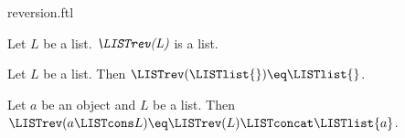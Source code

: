 \documentclass{naproche-library}
\begin{document}
\begin{smodule}[title=Reversion]{reversion.ftl}

\begin{signature}[forthel,id=RevSig]
  Let $L$ be a list.
  $\emph{\LISTrev(L)}$ is a list.
\end{signature}

\begin{axiom}[forthel,id=RevOfNilAx]
  Let $L$ be a list.
  Then $\LISTrev(\LISTlist{}) \eq \LISTlist{}$.
\end{axiom}

\begin{axiom}[forthel,id=RevOfConsAx]
  Let $a$ be an object and $L$ be a list.
  Then $\LISTrev(a \LISTcons L) \eq \LISTrev(L) \LISTconcat \LISTlist{a}$.
\end{axiom}
\end{smodule}
\end{document}
